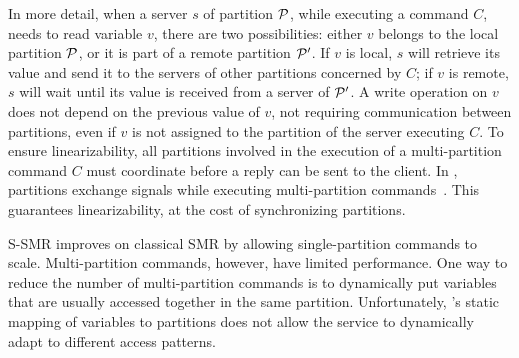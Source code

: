 In more detail, when a server $s$ of partition $\mathcal{P}$, while executing a command $C$, needs to read variable $v$, there are two possibilities:
either $v$ belongs to the local partition $\mathcal{P}$,
or it is part of a remote partition $\mathcal{P}'$. 
If $v$ is local, $s$ will retrieve its value and send it to the servers of other partitions concerned by $C$;
if $v$ is remote, $s$ will wait until its value is received from a server of $\mathcal{P}'$. 
A write operation on $v$ does not depend on the previous value of $v$, not requiring communication between partitions, even if $v$ is not assigned to the partition of the server executing $C$.
To ensure linearizability, all partitions involved in the execution of a multi-partition command $C$ must coordinate before a reply can be sent to the client.
In \ssmr{}, partitions exchange signals while executing multi-partition commands~\cite{bezerra2014ssmr}.
This guarantees linearizability, at the cost of synchronizing partitions.

S-SMR improves on classical SMR by allowing single-partition commands to scale. 
Multi-partition commands, however, have limited performance. 
One way to reduce the number of multi-partition commands is to dynamically put variables that are usually accessed together in the same partition.
Unfortunately, \ssmr 's static mapping of variables to partitions does not allow the service to dynamically adapt to different access patterns.

